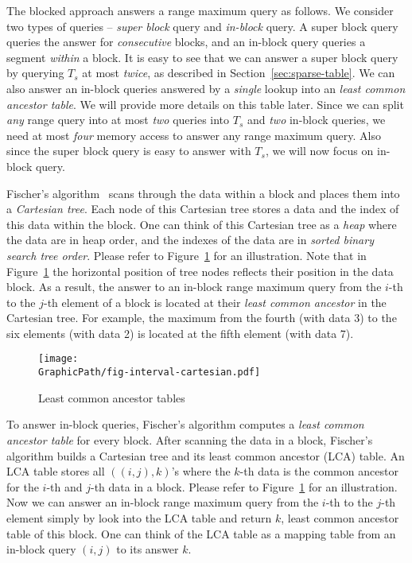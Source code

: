 The blocked approach answers a range maximum query as follows.  We
consider two types of queries -- {\em super block} query and {\em
  in-block} query.  A super block query queries the answer for {\em
  consecutive} blocks, and an in-block query queries a segment {\em
  within} a block.  It is easy to see that we can answer a super block
query by querying $T_s$ at most {\em twice}, as described in
Section~\ref{sec:sparse-table}.  We can also answer an in-block
queries answered by a {\em single} lookup into an {\em least common
  ancestor table}.  We will provide more details on this table later.
Since we can split {\em any} range query into at most {\em two}
queries into $T_s$ and {\em two} in-block queries, we need at most
{\em four} memory access to answer any range maximum query.  Also
since the super block query is easy to answer with $T_s$, we will now
focus on in-block query.

Fischer's algorithm~\cite{Fischer2006TheoreticalAP} scans through the
data within a block and places them into a {\em Cartesian tree}.  Each
node of this Cartesian tree stores a data and the index of this data
within the block.  One can think of this Cartesian tree as a {\em heap}
where the data are in heap order, and the indexes of the data are in
{\em sorted binary search tree order}.  Please refer to
Figure~\ref{fig:ancesstor-cartesian} for an illustration.  Note that in
Figure~\ref{fig:ancesstor-cartesian} the horizontal position of tree
nodes reflects their position in the data block.  As a result, the
answer to an in-block range maximum query from the $i$-th to the $j$-th
element of a block is located at their {\em least common ancestor} in
the Cartesian tree.  For example, the maximum from the fourth (with data
3) to the six elements (with data 2) is located at the fifth element
(with data 7).

\begin{figure}[!thb]   
  \centering
  \texttt{[image: \\GraphicPath/fig-interval-cartesian.pdf]}
  \caption{Least common ancestor tables}
  \label{fig:ancesstor-cartesian}
\end{figure}

To answer in-block queries, Fischer's algorithm computes a {\em least
common ancestor table} for every block.  After scanning the data in a
block, Fischer's algorithm builds a Cartesian tree and its least common
ancestor (LCA) table.  An LCA table stores all $((i, j), k)$'s where the
$k$-th data is the common ancestor for the $i$-th and $j$-th data in a
block.  Please refer to Figure~\ref{fig:ancesstor-cartesian} for an
illustration.  Now we can answer an in-block range maximum query from
the $i$-th to the $j$-th element simply by look into the LCA table and
return $k$,  least common ancestor table of this block.  One can think
of the LCA table as a mapping table from an in-block query $(i, j)$ to
its answer $k$.

